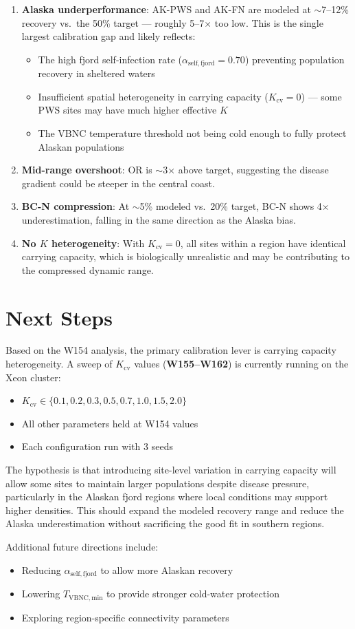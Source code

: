 \documentclass[11pt]{article}
\begin{document}
\begin{enumerate}
    \item \textbf{Alaska underperformance}: AK-PWS and AK-FN are modeled at $\sim$7--12\% recovery vs.\ the 50\% target --- roughly 5--7$\times$ too low. This is the single largest calibration gap and likely reflects:
    \begin{itemize}
        \item The high fjord self-infection rate ($\alpha_\mathrm{self,fjord} = 0.70$) preventing population recovery in sheltered waters
        \item Insufficient spatial heterogeneity in carrying capacity ($K_\mathrm{cv} = 0$) --- some PWS sites may have much higher effective $K$
        \item The VBNC temperature threshold not being cold enough to fully protect Alaskan populations
    \end{itemize}
    \item \textbf{Mid-range overshoot}: OR is $\sim$3$\times$ above target, suggesting the disease gradient could be steeper in the central coast.
    \item \textbf{BC-N compression}: At $\sim$5\% modeled vs.\ 20\% target, BC-N shows 4$\times$ underestimation, falling in the same direction as the Alaska bias.
    \item \textbf{No $K$ heterogeneity}: With $K_\mathrm{cv} = 0$, all sites within a region have identical carrying capacity, which is biologically unrealistic and may be contributing to the compressed dynamic range.
\end{enumerate}

\section{Next Steps}

Based on the W154 analysis, the primary calibration lever is carrying capacity heterogeneity. A sweep of $K_\mathrm{cv}$ values (\textbf{W155--W162}) is currently running on the Xeon cluster:

\begin{itemize}
    \item $K_\mathrm{cv} \in \{0.1, 0.2, 0.3, 0.5, 0.7, 1.0, 1.5, 2.0\}$
    \item All other parameters held at W154 values
    \item Each configuration run with 3 seeds
\end{itemize}

The hypothesis is that introducing site-level variation in carrying capacity will allow some sites to maintain larger populations despite disease pressure, particularly in the Alaskan fjord regions where local conditions may support higher densities. This should expand the modeled recovery range and reduce the Alaska underestimation without sacrificing the good fit in southern regions.

Additional future directions include:
\begin{itemize}
    \item Reducing $\alpha_\mathrm{self,fjord}$ to allow more Alaskan recovery
    \item Lowering $T_\mathrm{VBNC,min}$ to provide stronger cold-water protection
    \item Exploring region-specific connectivity parameters
\end{itemize}
\end{document}
